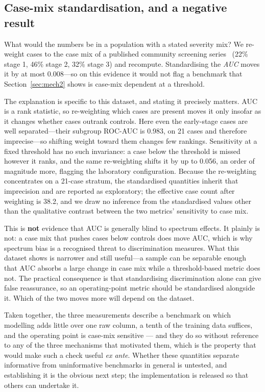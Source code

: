 \documentclass[conference]{IEEEtran}
\begin{document}
\subsection{Case-mix standardisation, and a negative result}

What would the numbers be in a population with a stated severity mix? We
re-weight cases to the case mix of a published community screening
series~\cite{kabir2026} (22\% stage 1, 46\% stage 2, 32\% stage 3) and
recompute. Standardising the \emph{AUC} moves it by at most 0.008---so on
this evidence it would not flag a benchmark that Section~\ref{sec:mech2} shows is
case-mix dependent at a threshold.

The explanation is specific to this dataset, and stating it precisely
matters. AUC is a rank statistic, so re-weighting which cases are present
moves it only insofar as it changes whether cases outrank controls. Here even
the early-stage cases are well separated---their subgroup ROC-AUC is 0.983,
on 21 cases and therefore imprecise---so shifting weight toward them changes
few rankings. Sensitivity at a fixed threshold has no such invariance: a case
below the threshold is missed however it ranks, and the same re-weighting
shifts it by up to 0.056, an order of magnitude more, flagging the laboratory
configuration. Because the re-weighting concentrates on a 21-case stratum,
the standardised quantities inherit that imprecision and are reported as
exploratory; the effective case count after weighting is 38.2, and we draw no
inference from the standardised values other than the qualitative contrast
between the two metrics' sensitivity to case mix.

This is \textbf{not} evidence that AUC is generally blind to spectrum
effects. It plainly is not: a case mix that pushes cases below controls does
move AUC, which is why spectrum bias is a recognised threat to discrimination
measures. What this dataset shows is narrower and still useful---a sample can
be separable enough that AUC absorbs a large change in case mix while a
threshold-based metric does not. The practical consequence is that
standardising discrimination alone can give false reassurance, so an
operating-point metric should be standardised alongside it. Which of the two
moves more will depend on the dataset.

Taken together, the three measurements describe a benchmark on which
modelling adds little over one raw column, a tenth of the training data
suffices, and the operating point is case-mix sensitive --- and they do so
without reference to any of the three mechanisms that motivated them, which
is the property that would make such a check useful \emph{ex ante}. Whether
these quantities separate informative from uninformative benchmarks in
general is untested, and establishing it is the obvious next step; the
implementation is released so that others can undertake it.
\end{document}
